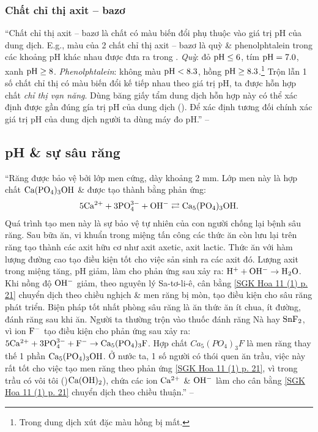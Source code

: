 \documentclass[oneside]{book}
\numberwithin{equation}{section}
\begin{document}
\subsubsection{Chất chỉ thị axit -- bazơ}
``Chất chỉ thị axit -- bazơ là chất có màu biến đổi phụ thuộc vào giá trị pH của dung dịch. E.g., màu của 2 chất chỉ thị axit -- bazơ là quỳ \& phenolphtalein trong các khoảng pH khác nhau được đưa ra trong \cite[Bảng 1.1, p. 19]{SGK_Hoa_Hoc_11_nang_cao}. \textit{Quỳ}: đỏ $\rm pH\le 6$, tím $\rm pH = 7.0$, xanh $\rm pH\ge 8$. \textit{Phenolphtalein}: không màu $\rm pH < 8.3$, hồng $\rm pH\ge 8.3$.\footnote{Trong dung dịch xút đặc màu hồng bị mất.} Trộn lẫn 1 số chất chỉ thị có màu biến đổi kế tiếp nhau theo giá trị pH, ta được hỗn hợp chất \textit{chỉ thị vạn năng}. Dùng băng giấy tẩm dung dịch hỗn hợp này có thể xác định được gần đúng gía trị pH của dung dịch (\cite[Hình 1.5: \textsf{Màu của chất chỉ thị vạn năng (thuốc thử MERCK của Đức) ở các giá trị pH khác nhau}, p. 19]{SGK_Hoa_Hoc_11_nang_cao}). Để xác định tương đối chính xác giá trị pH của dung dịch người ta dùng máy đo pH.'' -- \cite[p. 19]{SGK_Hoa_Hoc_11_nang_cao}

\subsection{pH \& sự sâu răng}
``Răng được bảo vệ bởi lớp men cứng, dày khoảng 2 mm. Lớp men này là hợp chất $\rm Ca(PO_4)_3OH$ \& được tạo thành bằng phản ứng:
\begin{align}
	\label{SGK Hoa 11 (1) p. 21}
	\rm 5Ca^{2+} + 3PO_4^{3-} + OH^-\rightleftarrows Ca_5(PO_4)_3OH.
\end{align}
Quá trình tạo men này là sự bảo vệ tự nhiên của con người chống lại bệnh sâu răng. Sau bữa ăn, vi khuẩn trong miệng tấn công các thức ăn còn lưu lại trên răng tạo thành các axit hữu cơ như axit axetic, axit lactic. Thức ăn với hàm lượng đường cao tạo điều kiện tốt cho việc sản sinh ra các axit đó. Lượng axit trong miệng tăng, pH giảm, làm cho phản ứng sau xảy ra: $\rm H^+ + OH^-\to H_2O$. Khi nồng độ $\rm OH^-$ giảm, theo nguyên lý Sa-tơ-li-ê, cân bằng \eqref{SGK Hoa 11 (1) p. 21} chuyển dịch theo chiều nghịch \& men răng bị mòn, tạo điều kiện cho sâu răng phát triển. Biện pháp tốt nhất phòng sâu răng là ăn thức ăn ít chua, ít đường, đánh răng sau khi ăn. Người ta thường trộn vào thuốc đánh răng Nà hay $\rm SnF_2$, vì ion $\rm F^-$ tạo điều kiện cho phản ứng sau xảy ra: $\rm 5Ca^{2+} + 3PO_4^{3-} + F^-\to Ca_5(PO_4)_3F$. Hợp chất $Ca_5(PO_4)_3F$ là men răng thay thế 1 phần $\rm Ca_5(PO_4)_3OH$. Ở nước ta, 1 số người có thói quen ăn trầu, việc này rất tốt cho việc tạo men răng theo phản ứng \eqref{SGK Hoa 11 (1) p. 21}, vì trong trầu có vôi tôi ()$\rm Ca(OH)_2$), chứa các ion $\rm Ca^{2+}$ \& $\rm OH^-$ làm cho cân bằng \eqref{SGK Hoa 11 (1) p. 21} chuyển dịch theo chiều thuận.'' -- \cite[p. 21]{SGK_Hoa_Hoc_11_nang_cao}
\end{document}
